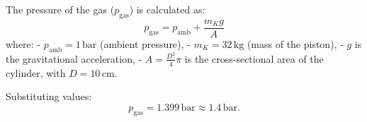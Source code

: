 The pressure of the gas (\( p_{\text{gas}} \)) is calculated as:  
\[
p_{\text{gas}} = p_{\text{amb}} + \frac{m_K g}{A}
\]  
where:  
- \( p_{\text{amb}} = 1 \, \text{bar} \) (ambient pressure),  
- \( m_K = 32 \, \text{kg} \) (mass of the piston),  
- \( g \) is the gravitational acceleration,  
- \( A = \frac{D^2}{4} \pi \) is the cross-sectional area of the cylinder, with \( D = 10 \, \text{cm} \).  

Substituting values:  
\[
p_{\text{gas}} = 1.399 \, \text{bar} \approx 1.4 \, \text{bar}.
\]